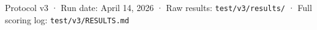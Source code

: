 \documentclass[10.5pt,a4paper]{article}
\begin{document}
\bigskip
\begin{center}

\medskip
{\small\color{dimgray}\lightfont
Protocol v3 · Run date: April 14, 2026 ·
Raw results: \texttt{test/v3/results/} ·
Full scoring log: \texttt{test/v3/RESULTS.md}
}
\end{center}
\end{document}
